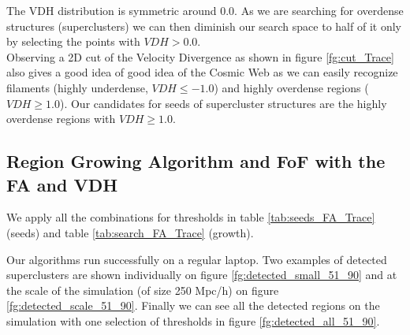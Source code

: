 \documentclass[12pt]{article}
\begin{document}
\begin{par}
The VDH distribution is symmetric
 around 0.0. As we are searching for overdense
  structures (superclusters) we can then diminish
   our search space to half of it only by
    selecting the points with $VDH > 0.0$. \\
Observing a 2D cut of the Velocity Divergence as shown in
 figure \ref{fg:cut_Trace} also gives a good idea
  of good idea of the Cosmic Web as we can easily
   recognize filaments (highly underdense, $VDH
    \leq - 1.0$) and highly overdense regions
     ($VDH \geq 1.0$). Our candidates
      for seeds of supercluster structures are the highly
       overdense regions with $VDH \geq 1.0$.
\end{par}


\subsection{Region Growing Algorithm and FoF with the FA and VDH}
\begin{par}
We apply all the combinations
   for thresholds in table \ref{tab:seeds_FA_Trace}
    (seeds)  and table \ref{tab:search_FA_Trace}
     (growth). \\
\end{par}

\begin{par}
Our algorithms run successfully on a regular
 laptop. Two examples of detected superclusters are
  shown individually on figure
   \ref{fg:detected_small_51_90} and at the scale
    of the simulation (of size 250 Mpc/h) on figure
     \ref{fg:detected_scale_51_90}. Finally we can
      see all the detected regions on the
       simulation with one selection of thresholds
        in figure \ref{fg:detected_all_51_90}.
\end{par}
\end{document}
